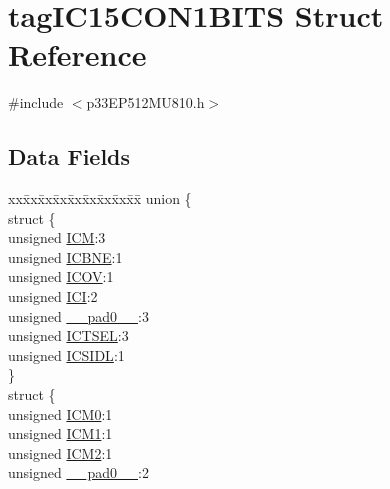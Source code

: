 \hypertarget{structtag_i_c15_c_o_n1_b_i_t_s}{}\section{tag\+I\+C15\+C\+O\+N1\+B\+I\+TS Struct Reference}
\label{structtag_i_c15_c_o_n1_b_i_t_s}


{\ttfamily \#include $<$p33\+E\+P512\+M\+U810.\+h$>$}

\subsection*{Data Fields}
\begin{DoxyCompactItemize}
\item 
\begin{tabbing}
xx\=xx\=xx\=xx\=xx\=xx\=xx\=xx\=xx\=\kill
union \{\\
\>struct \{\\
\>\>unsigned \hyperlink{structtag_i_c15_c_o_n1_b_i_t_s_ad3edde44ecb2d349ffa2decd0a251c20}{ICM}:3\\
\>\>unsigned \hyperlink{structtag_i_c15_c_o_n1_b_i_t_s_a824e7dcca83939e1b049d63ffcee33e9}{ICBNE}:1\\
\>\>unsigned \hyperlink{structtag_i_c15_c_o_n1_b_i_t_s_a49392949376ba0bf58cf8db889e86c94}{ICOV}:1\\
\>\>unsigned \hyperlink{structtag_i_c15_c_o_n1_b_i_t_s_a72486dcb868aad2d5c978494691356cc}{ICI}:2\\
\>\>unsigned \hyperlink{structtag_i_c15_c_o_n1_b_i_t_s_adf71f3d8410c1f1dbbc96680a92c49af}{\_\_pad0\_\_}:3\\
\>\>unsigned \hyperlink{structtag_i_c15_c_o_n1_b_i_t_s_a7a9dd41b5f93eb620df7fa336e452677}{ICTSEL}:3\\
\>\>unsigned \hyperlink{structtag_i_c15_c_o_n1_b_i_t_s_af441b36127c0bb7a35162dfc9a64103c}{ICSIDL}:1\\
\>\} \\
\>struct \{\\
\>\>unsigned \hyperlink{structtag_i_c15_c_o_n1_b_i_t_s_a649b1dd9bca75e558f37a9f52a829bd4}{ICM0}:1\\
\>\>unsigned \hyperlink{structtag_i_c15_c_o_n1_b_i_t_s_af3fe77ef9f8ca41ff11519f445e7bc77}{ICM1}:1\\
\>\>unsigned \hyperlink{structtag_i_c15_c_o_n1_b_i_t_s_a3c62c9cbbc3a406402126c932b709db8}{ICM2}:1\\
\>\>unsigned \hyperlink{structtag_i_c15_c_o_n1_b_i_t_s_adf71f3d8410c1f1dbbc96680a92c49af}{\_\_pad0\_\_}:2\\

\end{tabbing}
\end{DoxyCompactItemize}

